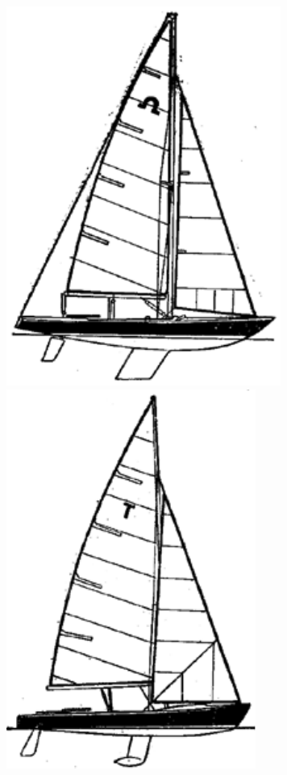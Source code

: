 \documentclass[a4paper, 12pt, twoside, final]{scrbook}
\begin{document}
\begin{figure}[htbp]
	\hfill{}\includegraphics[scale=0.7]{Soling}%
	\hfill{}\includegraphics[scale=0.7]{Tempest}%

\end{figure}
\end{document}
